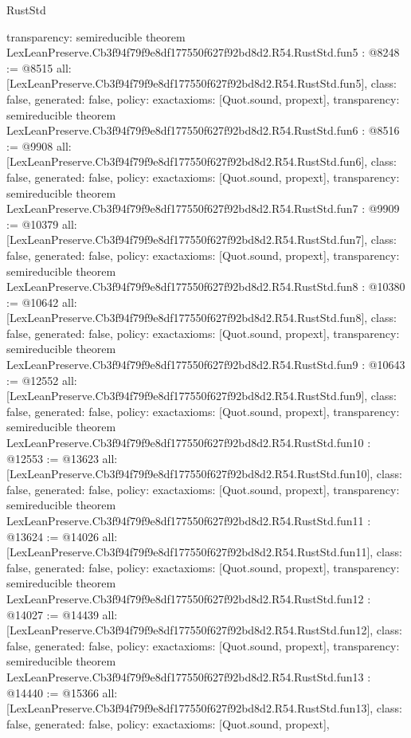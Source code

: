\begin{lexlean}{RustStd}
\begin{coremodule}
{  transparency: semireducible
}
theorem LexLeanPreserve.Cb3f94f79f9e8df177550f627f92bd8d2.R54.RustStd.fun5 : @8248 := @8515 {
  all: [LexLeanPreserve.Cb3f94f79f9e8df177550f627f92bd8d2.R54.RustStd.fun5],
  class: false,
  generated: false,
  policy: exact{axioms: [Quot.sound, propext]},
  transparency: semireducible
}
theorem LexLeanPreserve.Cb3f94f79f9e8df177550f627f92bd8d2.R54.RustStd.fun6 : @8516 := @9908 {
  all: [LexLeanPreserve.Cb3f94f79f9e8df177550f627f92bd8d2.R54.RustStd.fun6],
  class: false,
  generated: false,
  policy: exact{axioms: [Quot.sound, propext]},
  transparency: semireducible
}
theorem LexLeanPreserve.Cb3f94f79f9e8df177550f627f92bd8d2.R54.RustStd.fun7 : @9909 := @10379 {
  all: [LexLeanPreserve.Cb3f94f79f9e8df177550f627f92bd8d2.R54.RustStd.fun7],
  class: false,
  generated: false,
  policy: exact{axioms: [Quot.sound, propext]},
  transparency: semireducible
}
theorem LexLeanPreserve.Cb3f94f79f9e8df177550f627f92bd8d2.R54.RustStd.fun8 : @10380 := @10642 {
  all: [LexLeanPreserve.Cb3f94f79f9e8df177550f627f92bd8d2.R54.RustStd.fun8],
  class: false,
  generated: false,
  policy: exact{axioms: [Quot.sound, propext]},
  transparency: semireducible
}
theorem LexLeanPreserve.Cb3f94f79f9e8df177550f627f92bd8d2.R54.RustStd.fun9 : @10643 := @12552 {
  all: [LexLeanPreserve.Cb3f94f79f9e8df177550f627f92bd8d2.R54.RustStd.fun9],
  class: false,
  generated: false,
  policy: exact{axioms: [Quot.sound, propext]},
  transparency: semireducible
}
theorem LexLeanPreserve.Cb3f94f79f9e8df177550f627f92bd8d2.R54.RustStd.fun10 : @12553 := @13623 {
  all: [LexLeanPreserve.Cb3f94f79f9e8df177550f627f92bd8d2.R54.RustStd.fun10],
  class: false,
  generated: false,
  policy: exact{axioms: [Quot.sound, propext]},
  transparency: semireducible
}
theorem LexLeanPreserve.Cb3f94f79f9e8df177550f627f92bd8d2.R54.RustStd.fun11 : @13624 := @14026 {
  all: [LexLeanPreserve.Cb3f94f79f9e8df177550f627f92bd8d2.R54.RustStd.fun11],
  class: false,
  generated: false,
  policy: exact{axioms: [Quot.sound, propext]},
  transparency: semireducible
}
theorem LexLeanPreserve.Cb3f94f79f9e8df177550f627f92bd8d2.R54.RustStd.fun12 : @14027 := @14439 {
  all: [LexLeanPreserve.Cb3f94f79f9e8df177550f627f92bd8d2.R54.RustStd.fun12],
  class: false,
  generated: false,
  policy: exact{axioms: [Quot.sound, propext]},
  transparency: semireducible
}
theorem LexLeanPreserve.Cb3f94f79f9e8df177550f627f92bd8d2.R54.RustStd.fun13 : @14440 := @15366 {
  all: [LexLeanPreserve.Cb3f94f79f9e8df177550f627f92bd8d2.R54.RustStd.fun13],
  class: false,
  generated: false,
  policy: exact{axioms: [Quot.sound, propext]},
}
\end{coremodule}
\end{lexlean}
